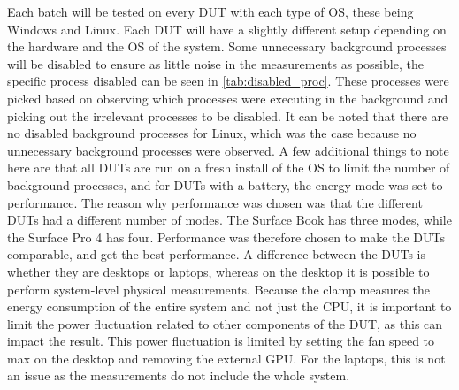 Each batch will be tested on every DUT with each type of OS, these being Windows and Linux. Each DUT will have a slightly different setup depending on the hardware and the OS of the system. Some unnecessary background processes will be disabled to ensure as little noise in the measurements as possible\cite[]{sestoft2013microbenchmarks}, the specific process disabled can be seen in \cref{tab:disabled_proc}. These processes were picked based on observing which processes were executing in the background and picking out the irrelevant processes to be disabled. It can be noted that there are no disabled background processes for Linux, which was the case because no unnecessary background processes were observed. A few additional things to note here are that all DUTs are run on a fresh install of the OS to limit the number of background processes, and for DUTs with a battery, the energy mode was set to performance. The reason why performance was chosen was that the different DUTs had a different number of modes. The Surface Book has three modes, while the Surface Pro 4 has four. Performance was therefore chosen to make the DUTs comparable, and get the best performance. A difference between the DUTs is whether they are desktops or laptops, whereas on the desktop it is possible to perform system-level physical measurements. Because the clamp measures the energy consumption of the entire system and not just the CPU, it is important to limit the power fluctuation related to other components of the DUT, as this can impact the result. This power fluctuation is limited by setting the fan speed to max on the desktop and removing the external GPU. For the laptops, this is not an issue as the measurements do not include the whole system.


